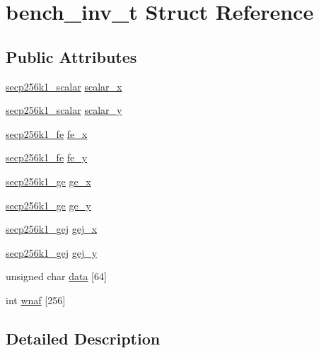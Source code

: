 \hypertarget{structbench__inv__t}{}\section{bench\+\_\+inv\+\_\+t Struct Reference}
\label{structbench__inv__t}
\subsection*{Public Attributes}
\begin{DoxyCompactItemize}
\item 
\hyperlink{structsecp256k1__scalar}{secp256k1\+\_\+scalar} \hyperlink{structbench__inv__t_afbceac71719c71325b7ad1b126b73734}{scalar\+\_\+x}
\item 
\hyperlink{structsecp256k1__scalar}{secp256k1\+\_\+scalar} \hyperlink{structbench__inv__t_a87f434ca8cb31f90f37dab4099e78822}{scalar\+\_\+y}
\item 
\hyperlink{structsecp256k1__fe}{secp256k1\+\_\+fe} \hyperlink{structbench__inv__t_a295aac5b6fa7c667c2869472e2512a4b}{fe\+\_\+x}
\item 
\hyperlink{structsecp256k1__fe}{secp256k1\+\_\+fe} \hyperlink{structbench__inv__t_af075523af15e7d92c74dd0748e8227af}{fe\+\_\+y}
\item 
\hyperlink{structsecp256k1__ge}{secp256k1\+\_\+ge} \hyperlink{structbench__inv__t_a61098b92fed00ae0f9f28707a9651f1d}{ge\+\_\+x}
\item 
\hyperlink{structsecp256k1__ge}{secp256k1\+\_\+ge} \hyperlink{structbench__inv__t_a0ff79efc25c6a6157bfe32eb51e231a3}{ge\+\_\+y}
\item 
\hyperlink{structsecp256k1__gej}{secp256k1\+\_\+gej} \hyperlink{structbench__inv__t_ad800b15a5597e319593b9b5dc216c3e7}{gej\+\_\+x}
\item 
\hyperlink{structsecp256k1__gej}{secp256k1\+\_\+gej} \hyperlink{structbench__inv__t_a3723df1adf93d090562d8e3c1cf9a6c1}{gej\+\_\+y}
\item 
unsigned char \hyperlink{structbench__inv__t_a56475198397964faa420c67fb2af4c7c}{data} \mbox{[}64\mbox{]}
\item 
int \hyperlink{structbench__inv__t_ad3f27ccce40e43c4d9efd6942b911de1}{wnaf} \mbox{[}256\mbox{]}
\end{DoxyCompactItemize}


\subsection{Detailed Description}


